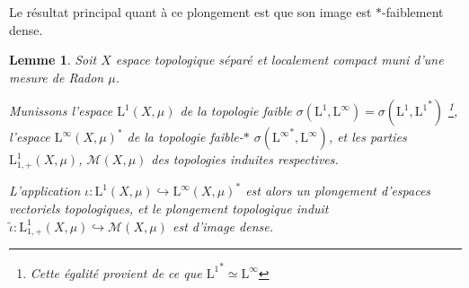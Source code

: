 \documentclass[a4paper,12pt]{article}
\newtheorem{lemma}[theorem]{Lemme}
\begin{document}
Le résultat principal quant à ce plongement est que son image est $*$-faiblement dense.

\begin{lemma}\label{dense_in_means}
    Soit $X$ espace topologique séparé et localement compact muni d'une mesure de Radon $\mu$.

    Munissons l'espace $\mathrm{L}^1(X,\mu)$ de la topologie faible $\sigma(\mathrm{L}^1, \mathrm{L}^\infty) = \sigma\left(\mathrm{L}^1, {\mathrm{L}^1}^*\right)$
    \footnote{Cette égalité provient de ce que ${\mathrm{L}^1}^*\simeq\mathrm{L}^\infty$}, 
    l'espace $\mathrm{L}^\infty(X,\mu)^*$ de la topologie faible-$*$ $\sigma({\mathrm{L}^\infty}^*, \mathrm{L}^\infty)$,
    et les parties $\mathrm{L}^1_{1, +}(X, \mu)$, $\mathcal{M}(X, \mu)$ des topologies induites respectives.

    L'application $\iota:\mathrm{L}^1(X,\mu)\hookrightarrow\mathrm{L}^\infty(X,\mu)^*$ est alors un plongement d'espaces 
    vectoriels topologiques, et le plongement topologique induit $\widetilde{\iota}:\mathrm{L}^1_{1, +}(X, \mu)\hookrightarrow \mathcal{M}(X, \mu)$
    est d'image dense. 
\end{lemma}
\end{document}

